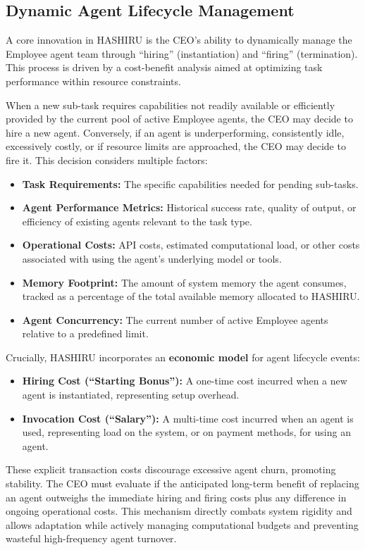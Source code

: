 \documentclass[conference]{IEEEtran}
\begin{document}
\subsection{Dynamic Agent Lifecycle Management}
\label{subsec:dynamic_mgmt}
A core innovation in HASHIRU is the CEO's ability to dynamically manage the Employee agent team through ``hiring'' (instantiation) and ``firing'' (termination). This process is driven by a cost-benefit analysis aimed at optimizing task performance within resource constraints.

When a new sub-task requires capabilities not readily available or efficiently provided by the current pool of active Employee agents, the CEO may decide to hire a new agent. Conversely, if an agent is underperforming, consistently idle, excessively costly, or if resource limits are approached, the CEO may decide to fire it. This decision considers multiple factors:
\begin{itemize}
    \item \textbf{Task Requirements:} The specific capabilities needed for pending sub-tasks.
    \item \textbf{Agent Performance Metrics:} Historical success rate, quality of output, or efficiency of existing agents relevant to the task type.
    \item \textbf{Operational Costs:} API costs, estimated computational load, or other costs associated with using the agent's underlying model or tools.
    \item \textbf{Memory Footprint:} The amount of system memory the agent consumes, tracked as a percentage of the total available memory allocated to HASHIRU.
    \item \textbf{Agent Concurrency:} The current number of active Employee agents relative to a predefined limit.
\end{itemize}

Crucially, HASHIRU incorporates an \textbf{economic model} for agent lifecycle events:
\begin{itemize}
    \item \textbf{Hiring Cost (``Starting Bonus''):} A one-time cost incurred when a new agent is instantiated, representing setup overhead.
    \item \textbf{Invocation Cost (``Salary''):} A multi-time cost incurred when an agent is used, representing load on the system, or on payment methods, for using an agent.
\end{itemize}
These explicit transaction costs discourage excessive agent churn, promoting stability. The CEO must evaluate if the anticipated long-term benefit of replacing an agent outweighs the immediate hiring and firing costs plus any difference in ongoing operational costs. This mechanism directly combats system rigidity and allows adaptation while actively managing computational budgets and preventing wasteful high-frequency agent turnover.
\end{document}
